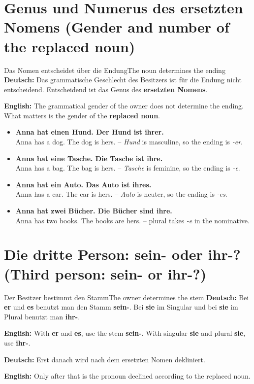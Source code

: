 \documentclass[a4paper,11pt]{article}
\newcommand{\GermanText}[1]{\textbf{Deutsch: }#1\par}
\newcommand{\EnglishText}[1]{{\small\color{SoftGray}\textbf{English: }#1\par}}
\newcommand{\ExampleItem}[2]{\item \textbf{#1}\\{\small\color{SoftGray}#2}}
\begin{document}
    \section{Genus und Numerus des ersetzten Nomens \textnormal{(Gender and number of the replaced noun)}}

        \begin{grammarentry}{Das Nomen entscheidet über die Endung}{The noun determines the ending}
            \GermanText{Das grammatische Geschlecht des Besitzers ist für die Endung nicht entscheidend. Entscheidend ist das Genus des \textbf{ersetzten Nomens}.}
            \EnglishText{The grammatical gender of the owner does not determine the ending. What matters is the gender of the \textbf{replaced noun}.}
        \end{grammarentry}

        \begin{exbox}
            \begin{itemize}
                \ExampleItem{Anna hat einen Hund. Der Hund ist ihrer.}{Anna has a dog. The dog is hers. -- \textit{Hund} is masculine, so the ending is \textit{-er}.}
                \ExampleItem{Anna hat eine Tasche. Die Tasche ist ihre.}{Anna has a bag. The bag is hers. -- \textit{Tasche} is feminine, so the ending is \textit{-e}.}
                \ExampleItem{Anna hat ein Auto. Das Auto ist ihres.}{Anna has a car. The car is hers. -- \textit{Auto} is neuter, so the ending is \textit{-es}.}
                \ExampleItem{Anna hat zwei Bücher. Die Bücher sind ihre.}{Anna has two books. The books are hers. -- plural takes \textit{-e} in the nominative.}
            \end{itemize}
        \end{exbox}

    \section{Die dritte Person: sein- oder ihr-? \textnormal{(Third person: sein- or ihr-?)}}

        \begin{grammarentry}{Der Besitzer bestimmt den Stamm}{The owner determines the stem}
            \GermanText{Bei \textbf{er} und \textbf{es} benutzt man den Stamm \textbf{sein-}. Bei \textbf{sie} im Singular und bei \textbf{sie} im Plural benutzt man \textbf{ihr-}.}
            \EnglishText{With \textbf{er} and \textbf{es}, use the stem \textbf{sein-}. With singular \textbf{sie} and plural \textbf{sie}, use \textbf{ihr-}.}

            \GermanText{Erst danach wird nach dem ersetzten Nomen dekliniert.}
            \EnglishText{Only after that is the pronoun declined according to the replaced noun.}
        \end{grammarentry}
\end{document}
